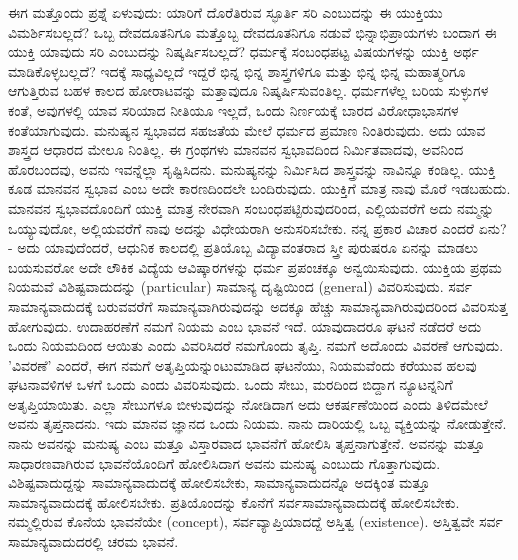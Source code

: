 ಈಗ ಮತ್ತೊಂದು ಪ್ರಶ್ನೆ ಏಳುವುದು: ಯಾರಿಗೆ ದೊರೆತಿರುವ ಸ್ಫೂರ್ತಿ ಸರಿ ಎಂಬುದನ್ನು ಈ ಯುಕ್ತಿಯು ವಿಮರ್ಶಿಸಬಲ್ಲದೆ? ಒಬ್ಬ ದೇವದೂತನಿಗೂ ಮತ್ತೊಬ್ಬ ದೇವದೂತನಿಗೂ ನಡುವೆ ಭಿನ್ನಾಭಿಪ್ರಾಯಗಳು ಬಂದಾಗ ಈ ಯುಕ್ತಿ ಯಾವುದು ಸರಿ ಎಂಬುದನ್ನು ನಿಷ್ಕರ್ಷಿಸಬಲ್ಲದೆ? ಧರ್ಮಕ್ಕೆ ಸಂಬಂಧಪಟ್ಟ ವಿಷಯಗಳನ್ನು ಯುಕ್ತಿ ಅರ್ಥ ಮಾಡಿಕೊಳ್ಳಬಲ್ಲದೆ? ಇದಕ್ಕೆ ಸಾಧ್ಯವಿಲ್ಲದೆ ಇದ್ದರೆ ಭಿನ್ನ ಭಿನ್ನ ಶಾಸ್ತ್ರಗಳಿಗೂ ಮತ್ತು ಭಿನ್ನ ಭಿನ್ನ ಮಹಾತ್ಮರಿಗೂ ಆಗುತ್ತಿರುವ ಬಹಳ ಕಾಲದ ಹೋರಾಟವನ್ನು ಮತ್ತಾವುದೂ ನಿಷ್ಕರ್ಷಿಸುವಂತಿಲ್ಲ. ಧರ್ಮಗಳೆಲ್ಲ ಬರಿಯ ಸುಳ್ಳುಗಳ ಕಂತೆ, ಅವುಗಳಲ್ಲಿ ಯಾವ ಸರಿಯಾದ ನೀತಿಯೂ ಇಲ್ಲದೆ, ಒಂದು ನಿರ್ಣಯಕ್ಕೆ ಬಾರದ ವಿರೋಧಾಭಾಸಗಳ ಕಂತೆಯಾಗುವುದು. ಮನುಷ್ಯನ ಸ್ವಭಾವದ ಸಹಜತೆಯ ಮೇಲೆ ಧರ್ಮದ ಪ್ರಮಾಣ ನಿಂತಿರುವುದು. ಅದು ಯಾವ ಶಾಸ್ತ್ರದ ಆಧಾರದ ಮೇಲೂ ನಿಂತಿಲ್ಲ. ಈ ಗ್ರಂಥಗಳು ಮಾನವನ ಸ್ವಭಾವದಿಂದ ನಿರ್ಮಿತವಾದವು, ಅವನಿಂದ ಹೊರಬಂದವು, ಅವನು ಇವನ್ನೆಲ್ಲಾ ಸೃಷ್ಟಿಸಿದನು. ಮನುಷ್ಯನನ್ನು ನಿರ್ಮಿಸಿದ ಶಾಸ್ತ್ರವನ್ನು ನಾವಿನ್ನೂ ಕಂಡಿಲ್ಲ. ಯುಕ್ತಿ ಕೂಡ ಮಾನವನ ಸ್ವಭಾವ ಎಂಬ ಅದೇ ಕಾರಣದಿಂದಲೇ ಬಂದಿರುವುದು. ಯುಕ್ತಿಗೆ ಮಾತ್ರ ನಾವು ಮೊರೆ ಇಡಬಹುದು. ಮಾನವನ ಸ್ವಭಾವದೊಂದಿಗೆ ಯುಕ್ತಿ ಮಾತ್ರ ನೇರವಾಗಿ ಸಂಬಂಧಪಟ್ಟಿರುವುದರಿಂದ, ಎಲ್ಲಿಯವರೆಗೆ ಅದು ನಮ್ಮನ್ನು ಒಯ್ಯುವುದೋ, ಅಲ್ಲಿಯವರೆಗೆ ನಾವು ಅದನ್ನು ವಿಧೇಯರಾಗಿ ಅನುಸರಿಸಬೇಕು. ನನ್ನ ಪ್ರಕಾರ ವಿಚಾರ ಎಂದರೆ ಏನು? - ಅದು ಯಾವುದೆಂದರೆ, ಆಧುನಿಕ ಕಾಲದಲ್ಲಿ ಪ್ರತಿಯೊಬ್ಬ ವಿದ್ಯಾವಂತರಾದ ಸ್ತ್ರೀ ಪುರುಷರೂ ಏನನ್ನು ಮಾಡಲು ಬಯಸುವರೋ ಅದೇ ಲೌಕಿಕ ವಿದ್ಯೆಯ ಆವಿಷ್ಕಾರಗಳನ್ನು ಧರ್ಮ ಪ್ರಪಂಚಕ್ಕೂ ಅನ್ವಯಿಸುವುದು. ಯುಕ್ತಿಯ ಪ್ರಥಮ ನಿಯಮವೆ ವಿಶಿಷ್ಟವಾದುದನ್ನು (particular) ಸಾಮಾನ್ಯ ದೃಷ್ಟಿಯಿಂದ (general) ವಿವರಿಸುವುದು. ಸರ್ವ ಸಾಮಾನ್ಯವಾದುದಕ್ಕೆ ಬರುವವರೆಗೆ ಸಾಮಾನ್ಯವಾಗಿರುವುದನ್ನು ಅದಕ್ಕೂ ಹೆಚ್ಚು ಸಾಮಾನ್ಯವಾಗಿರುವುದರಿಂದ ವಿವರಿಸುತ್ತ ಹೋಗುವುದು. ಉದಾಹರಣೆಗೆ ನಮಗೆ ನಿಯಮ ಎಂಬ ಭಾವನೆ ಇದೆ. ಯಾವುದಾದರೂ ಘಟನೆ ನಡೆದರೆ ಅದು ಒಂದು ನಿಯಮದಿಂದ ಆಯಿತು ಎಂದು ವಿವರಿಸಿದರೆ ನಮಗೊಂದು ತೃಪ್ತಿ. ನಮಗೆ ಅದೊಂದು ವಿವರಣೆ ಆಗುವುದು. 'ವಿವರಣೆ' ಎಂದರೆ, ಈಗ ನಮಗೆ ಅತೃಪ್ತಿಯನ್ನುಂಟುಮಾಡಿದ ಘಟನೆಯು, ನಿಯಮವೆಂದು ಕರೆಯುವ ಹಲವು ಘಟನಾವಳಿಗಳ ಒಳಗೆ ಒಂದು ಎಂದು ವಿವರಿಸುವುದು. ಒಂದು ಸೇಬು, ಮರದಿಂದ ಬಿದ್ದಾಗ ನ್ಯೂಟನ್ನನಿಗೆ ಅತೃಪ್ತಿಯಾಯಿತು. ಎಲ್ಲಾ ಸೇಬುಗಳೂ ಬೀಳುವುದನ್ನು ನೋಡಿದಾಗ ಅದು ಆಕರ್ಷಣೆಯಿಂದ ಎಂದು ತಿಳಿದಮೇಲೆ ಅವನು ತೃಪ್ತನಾದನು. ಇದು ಮಾನವ ಜ್ಞಾನದ ಒಂದು ನಿಯಮ. ನಾನು ದಾರಿಯಲ್ಲಿ ಒಬ್ಬ ವ್ಯಕ್ತಿಯನ್ನು ನೋಡುತ್ತೇನೆ. ನಾನು ಅವನನ್ನು ಮನುಷ್ಯ ಎಂಬ ಮತ್ತೂ ವಿಸ್ತಾರವಾದ ಭಾವನೆಗೆ ಹೋಲಿಸಿ ತೃಪ್ತನಾಗುತ್ತೇನೆ. ಅವನನ್ನು ಮತ್ತೂ ಸಾಧಾರಣವಾಗಿರುವ ಭಾವನೆಯೊಂದಿಗೆ ಹೋಲಿಸಿದಾಗ ಅವನು ಮನುಷ್ಯ ಎಂಬುದು ಗೊತ್ತಾಗುವುದು. ವಿಶಿಷ್ಟವಾದುದ್ದನ್ನು ಸಾಮಾನ್ಯವಾದುದಕ್ಕೆ ಹೋಲಿಸಬೇಕು, ಸಾಮಾನ್ಯವಾದುದನ್ನೊ ಅದಕ್ಕಿಂತ ಮತ್ತೂ ಸಾಮಾನ್ಯವಾದುದಕ್ಕೆ ಹೋಲಿಸಬೇಕು. ಪ್ರತಿಯೊಂದನ್ನು ಕೊನೆಗೆ ಸರ್ವಸಾಮಾನ್ಯವಾದುದಕ್ಕೆ ಹೋಲಿಸಬೇಕು. ನಮ್ಮಲ್ಲಿರುವ ಕೊನೆಯ ಭಾವನೆಯೇ (concept), ಸರ್ವವ್ಯಾಪ್ತಿಯಾದದ್ದೆ ಅಸ್ತಿತ್ವ (existence). ಅಸ್ತಿತ್ವವೇ ಸರ್ವ ಸಾಮಾನ್ಯವಾದುದರಲ್ಲಿ ಚರಮ ಭಾವನೆ.

